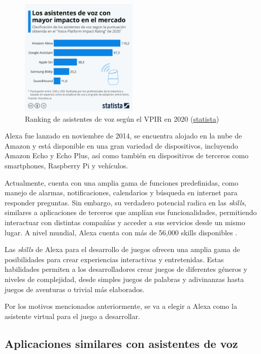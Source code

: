 \begin{figure}[H]
    \centering
    \includegraphics[width=0.5\textwidth]{imgs/grafico-asistentes.jpeg}
    \caption{Ranking de asistentes de voz según el VPIR en 2020 (\href{https://es.statista.com/grafico/22578/clasificacion-de-los-asistentes-de-voz/}{statista})}
    \label{fig:grafico-asistentes}
\end{figure}

Alexa fue lanzado en noviembre de 2014, se encuentra alojado en la nube de Amazon y está disponible en una gran variedad de dispositivos, incluyendo Amazon Echo y Echo Plus, así como también en dispositivos de terceros como smartphones, Raspberry Pi y vehículos.

Actualmente, cuenta con una amplia gama de funciones predefinidas, como manejo de alarmas, notificaciones, calendarios y búsqueda en internet para responder preguntas. Sin embargo, su verdadero potencial radica en las \textit{skills}, similares a aplicaciones de terceros que amplían sus funcionalidades, permitiendo interactuar con distintas compañías y acceder a sus servicios desde un mismo lugar. A nivel mundial, Alexa cuenta con más de 56,000 skills disponibles \parencite{tfgAlexa2}.

Las \textit{skills} de Alexa para el desarrollo de juegos ofrecen una amplia gama de posibilidades para crear experiencias interactivas y entretenidas. Estas habilidades permiten a los desarrolladores crear juegos de diferentes géneros y niveles de complejidad, desde simples juegos de palabras y adivinanzas hasta juegos de aventuras o trivial más elaborados.

Por los motivos mencionados anteriormente, se va a elegir a Alexa como la asistente virtual para el juego a desarrollar.

\subsection{Aplicaciones similares con asistentes de voz}

